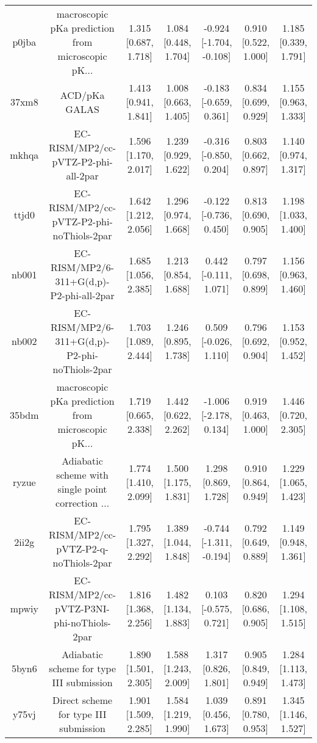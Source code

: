 \documentclass{article}
\begin{document}
\begin{center}
\begin{longtable}{|ccccccc|}
 p0jba &  macroscopic pKa prediction from microscopic pK... &  1.315 [0.687, 1.718] &  1.084 [0.448, 1.704] &  -0.924 [-1.704, -0.108] &  0.910 [0.522, 1.000] &   1.185 [0.339, 1.791] \\
 37xm8 &                                      ACD/pKa GALAS &  1.413 [0.941, 1.841] &  1.008 [0.663, 1.405] &   -0.183 [-0.659, 0.361] &  0.834 [0.699, 0.929] &   1.155 [0.963, 1.333] \\
 mkhqa &                EC-RISM/MP2/cc-pVTZ-P2-phi-all-2par &  1.596 [1.170, 2.017] &  1.239 [0.929, 1.622] &   -0.316 [-0.850, 0.204] &  0.803 [0.662, 0.897] &   1.140 [0.974, 1.317] \\
 ttjd0 &           EC-RISM/MP2/cc-pVTZ-P2-phi-noThiols-2par &  1.642 [1.212, 2.056] &  1.296 [0.974, 1.668] &   -0.122 [-0.736, 0.450] &  0.813 [0.690, 0.905] &   1.198 [1.033, 1.400] \\
 nb001 &           EC-RISM/MP2/6-311+G(d,p)-P2-phi-all-2par &  1.685 [1.056, 2.385] &  1.213 [0.854, 1.688] &    0.442 [-0.111, 1.071] &  0.797 [0.698, 0.899] &   1.156 [0.963, 1.460] \\
 nb002 &      EC-RISM/MP2/6-311+G(d,p)-P2-phi-noThiols-2par &  1.703 [1.089, 2.444] &  1.246 [0.895, 1.738] &    0.509 [-0.026, 1.110] &  0.796 [0.692, 0.904] &   1.153 [0.952, 1.452] \\
 35bdm &  macroscopic pKa prediction from microscopic pK... &  1.719 [0.665, 2.338] &  1.442 [0.622, 2.262] &   -1.006 [-2.178, 0.134] &  0.919 [0.463, 1.000] &   1.446 [0.720, 2.305] \\
 ryzue &  Adiabatic scheme with single point correction ... &  1.774 [1.410, 2.099] &  1.500 [1.175, 1.831] &     1.298 [0.869, 1.728] &  0.910 [0.864, 0.949] &   1.229 [1.065, 1.423] \\
 2ii2g &             EC-RISM/MP2/cc-pVTZ-P2-q-noThiols-2par &  1.795 [1.327, 2.292] &  1.389 [1.044, 1.848] &  -0.744 [-1.311, -0.194] &  0.792 [0.649, 0.889] &   1.149 [0.948, 1.361] \\
 mpwiy &         EC-RISM/MP2/cc-pVTZ-P3NI-phi-noThiols-2par &  1.816 [1.368, 2.256] &  1.482 [1.134, 1.883] &    0.103 [-0.575, 0.721] &  0.820 [0.686, 0.905] &   1.294 [1.108, 1.515] \\
 5byn6 &           Adiabatic scheme for type III submission &  1.890 [1.501, 2.305] &  1.588 [1.243, 2.009] &     1.317 [0.826, 1.801] &  0.905 [0.849, 0.949] &   1.284 [1.113, 1.473] \\
 y75vj &              Direct scheme for type III submission &  1.901 [1.509, 2.285] &  1.584 [1.219, 1.990] &     1.039 [0.456, 1.673] &  0.891 [0.780, 0.953] &   1.345 [1.146, 1.527] \\

\end{longtable}
\end{center}
\end{document}
